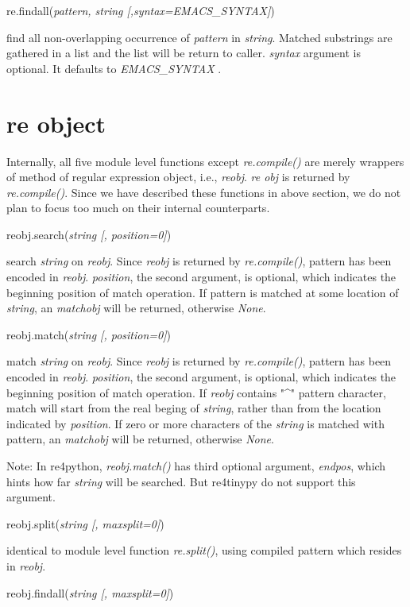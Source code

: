 \documentclass[12pt]{article}
\begin{document}
re.findall({\em pattern, string [,syntax=EMACS\_SYNTAX]})


find all non-overlapping occurrence of {\em pattern} in {\em string}. Matched substrings are gathered in a list and the list will be return to caller. {\em syntax} argument is optional. It defaults to \emph{  EMACS\_SYNTAX }.

\section{re object}

Internally, all five module level functions except {\em re.compile()} are merely wrappers of method of regular expression object, i.e., {\em reobj}. {\em re obj} is returned by {\em re.compile()}. Since we have described these functions in above section, we do not plan to focus too much on their internal counterparts. 


reobj.search({\em string [, position=0]})


search {\em string} on {\em reobj}. Since {\em reobj} is returned by {\em re.compile()}, pattern has been encoded in {\em reobj}. {\em position}, the second argument, is optional, which indicates the beginning position of match operation. If pattern is matched at some location of {\em string}, an {\em matchobj} will be returned, otherwise {\em None}.


reobj.match({\em string [, position=0]})

match {\em string} on {\em reobj}. Since {\em reobj} is returned by {\em re.compile()}, pattern has been encoded in {\em reobj}. {\em position}, the second argument, is optional, which indicates the beginning position of match operation. If {\em reobj} contains "\^{}" pattern character, match will start from the real beging of {\em string}, rather than from the location indicated by {\em position}. If zero or more characters of the {\em string} is matched with pattern, an {\em matchobj} will be returned, otherwise {\em None}.

Note: In re4python, {\em reobj.match()} has third optional argument, {\em endpos}, which hints how far {\em string} will be searched. But re4tinypy do not support this argument.


reobj.split({\em string [, maxsplit=0]})

identical to module level function {\em re.split()}, using compiled pattern which resides in {\em reobj}.


reobj.findall({\em string [, maxsplit=0]})
\end{document}
